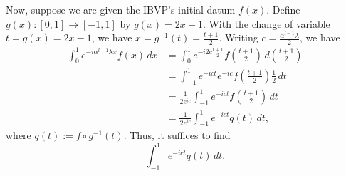 \documentclass[11pt, oneside, a4paper]{article}
\begin{document}
Now, suppose we are given the IBVP's initial datum $f(x)$. Define $g(x):[0,1]\to [-1,1]$ by $g(x)=2x-1$. With the change of variable $t=g(x)=2x-1$, we have $x=g^{-1}(t)=\frac{t+1}{2}$. Writing $c=\frac{\alpha^{l-1}\lambda}{2}$, we have
\begin{align*}
    \int_0^1 e^{-i\alpha^{l-1}\lambda x}f(x)\,dx &= \int_0^1 e^{-i2c\frac{t+1}{2}}f\left(\frac{t+1}{2}\right)\,d\left(\frac{t+1}{2}\right)\\
    &= \int_{-1}^1 e^{-ict}e^{-ic}f\left(\frac{t+1}{2}\right)\frac{1}{2}\,dt\\
    &= \frac{1}{2e^{ic}}\int_{-1}^1 e^{-ict} f\left(\frac{t+1}{2}\right)\,dt\\
    &= \frac{1}{2e^{ic}}\int_{-1}^1 e^{-ict} q(t)\,dt,
\end{align*}
where $q(t) := f\circ g^{-1}(t)$. Thus, it suffices to find 
\[\int_{-1}^1 e^{-ict} q(t)\,dt.\]
\end{document}

